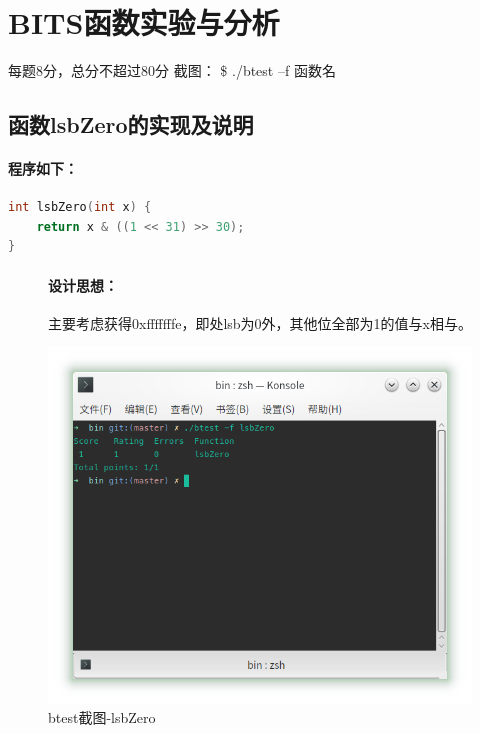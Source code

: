 \section{BITS函数实验与分析}
\begin{center}
    每题8分，总分不超过80分
    截图：  \$ ./btest –f 函数名
\end{center}

\subsection{函数lsbZero的实现及说明}

\paragraph{程序如下：}
\begin{lstlisting}[language = c]
int lsbZero(int x) {
	return x & ((1 << 31) >> 30);
}
\end{lstlisting}

\begin{figure}[H]
\begin{minipage}[c]{0.5\linewidth}
\paragraph{设计思想：}主要考虑获得0xfffffffe，即处lsb为0外，其他位全部为1的值与x相与。
\end{minipage}
\begin{minipage}[c]{0.4\linewidth}
\centering
\includegraphics[width=0.9\linewidth]{figures/lsbzero}
\caption{btest截图-lsbZero}
\label{fig:lsbzero}
\end{minipage}
\end{figure}

